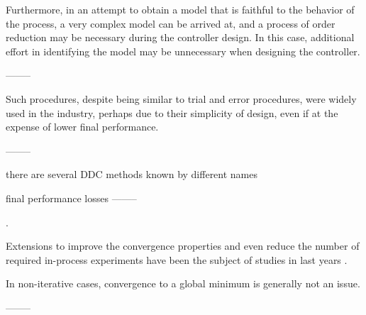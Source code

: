 
Furthermore, in an attempt to obtain a model that is faithful to the behavior of the process, a very complex model can be arrived at, and a process of order reduction may be necessary during the controller design. In this case, additional effort in identifying the model may be unnecessary when designing the controller.

--------


Such procedures, despite being similar to trial and error procedures, were widely used in the industry, perhaps due to their simplicity of design, even if at the expense of lower final performance.

--------

there are several DDC methods known by different names


final performance losses
--------

\citep{huusom2009}.

Extensions to improve the convergence properties and even reduce the number of required in-process experiments have been the subject of studies in last years \citep{huusom2009}.


In non-iterative cases, convergence to a global minimum is generally not an issue.

--------


